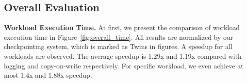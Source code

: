 \documentclass[conference]{IEEEtran}
\begin{document}



\subsection{Overall Evaluation}\label{sec:evaluation_overall}


\textbf{Workload Execution Time.}
At first, we present the comparison of workload execution time in Figure~\ref{fig:overall_time}.
All results are normalized by our checkpointing system, which is marked as Twins in figures.
A speedup for all workloads are observed.
The average speedup is 1.29x and 1.19x compared with logging and copy-on-write respectively.
For specific workload, we even achieve at most 1.4x and 1.88x speedup.
\end{document}
